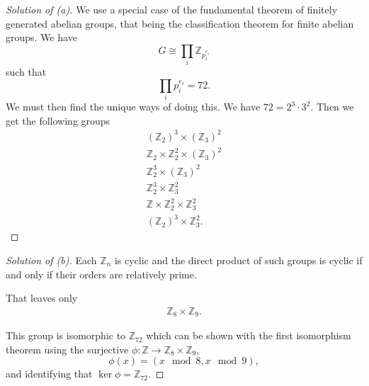 \begin{proof}[Solution of (a)]
    We use a special case of the fundamental 
    theorem of finitely generated abelian groups, 
    that being the classification theorem for 
    finite abelian groups. We have 
    \[
        G \cong \prod_{i}\mathbb Z_{p_i^{e_i}}
    \] 
    such that 
    \[
        \prod_{i}p_i^{e_i} = 72. 
    \]
    We must then find the unique 
    ways of doing this. 
    We have $72 = 2^3 \cdot 3^2$. 
    Then we get the following groups 
    \begin{align*}
        (\mathbb Z_2)^3 \times (\mathbb Z_3)^2 \\ 
        \mathbb Z_2 \times \mathbb Z_2^2 \times (\mathbb Z_3)^2 \\ 
        \mathbb Z_2^3 \times (\mathbb Z_3)^2 \\ 
        \mathbb Z_2^3 \times \mathbb Z_3^2 \\ 
        \mathbb Z \times \mathbb Z_2^2 \times \mathbb Z_3^2 \\ 
        (\mathbb Z_2)^3 \times \mathbb Z_3^2. 
    \end{align*}
\end{proof}
\begin{proof}[Solution of (b)]
    Each $\mathbb Z_n$ is cyclic and the direct 
    product of such groups is cyclic if and only if 
    their orders are relatively prime. 

    That leaves only 
    \begin{align*}
        \mathbb Z_8 \times \mathbb Z_9. 
    \end{align*}

    This group is isomorphic to 
    $\mathbb Z_{72}$ which can be shown 
    with the first isomorphism theorem 
    using the surjective $\phi : \mathbb Z \to 
    \mathbb Z_8 \times \mathbb Z_9$, 
    \[
        \phi(x) = (x \mod 8, x \mod 9),
    \]
    and identifying that $\ker \phi = \mathbb Z_{72}$.
\end{proof}

